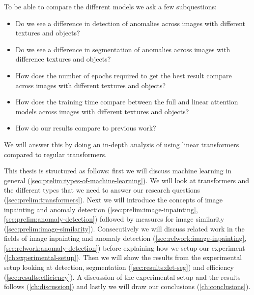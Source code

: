 To be able to compare the different models we ask a few subquestions:
\begin{itemize}
    \item Do we see a difference in detection of anomalies across images with different textures and objects?
    \item Do we see a difference in segmentation of anomalies across images with difference textures and objects?
    \item How does the number of epochs required to get the best result compare across images with different textures and objects?
    \item How does the training time compare between the full and linear attention models across images with different textures and objects?
    \item How do our results compare to previous work?
\end{itemize}

We will answer this by doing an in-depth analysis of using linear transformers compared to regular transformers.

This thesis is structured as follows: first we will discuss machine learning in general (\ref{sec:prelim:types-of-machine-learning}). We will look at transformers and the different types that we need to answer our research questions (\ref{sec:prelim:transformers}). Next we will introduce the concepts of image inpainting and anomaly detection (\ref{sec:prelim:image-inpainting}, \ref{sec:prelim:anomaly-detection}) followed by measures for image similarity (\ref{sec:prelim:image-similarity}). Consecutively we will discuss related work in the fields of image inpainting and anomaly detection (\ref{sec:relwork:image-inpainting}, \ref{sec:relwork:anomaly-detection}) before explaining how we setup our experiment (\ref{ch:experimental-setup}). Then we will show the results from the experimental setup looking at detection, segmentation (\ref{sec:results:det-seg}) and efficiency (\ref{sec:results:efficiency}). A discussion of the experimental setup and the results follows (\ref{ch:discussion}) and lastly we will draw our conclusions (\ref{ch:conclusions}).